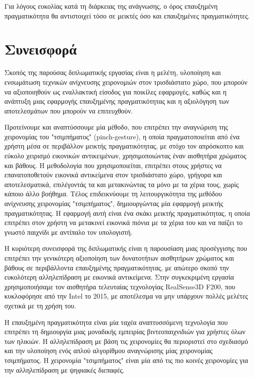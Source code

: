 Για λόγους ευκολίας κατά τη διάρκειας της ανάγνωσης, ο όρος επαυξημένη πραγματικότητα θα αντιστοιχεί τόσο σε μεικτές όσο και επαυξημένες πραγματικότητες.



\section{Συνεισφορά}

  

Σκοπός της παρούσας διπλωματικής εργασίας είναι η μελέτη, υλοποίηση και ενσωμάτωση τεχνικών ανίχνευσης χειρονομιών στον τρισδιάστατο χώρο, που μπορούν να αξιοποιηθούν ως εναλλακτική είσοδος για ποικίλες εφαρμογές, καθώς και η ανάπτυξη μιας εφαρμογής επαυξημένης πραγματικότητας και η αξιολόγηση των αποτελεσμάτων που μπορούν να επιτευχθούν. 



Προτείνουμε και αναπτύσσουμε μία μέθοδο, που επιτρέπει την αναγνώριση της χειρονομίας του "τσιμπήματος" (pinch-gesture), η οποία πραγματοποιείται από ένα χρήστη μέσα σε περιβάλλον μεικτής πραγματικότητας, με στόχο τον απρόσκοπτο και εύκολο χειρισμό εικονικών αντικειμένων, χρησιμοποιώντας έναν αισθητήρα χρώματος και βάθους. Η μεθοδολογία που χρησιμοποιείται, επιτρέπει στους χρήστες να επανατοποθετούν εικονικά αντικείμενα στον τρισδιάστατο χώρο, γρήγορα και αποτελεσματικά, επιλέγοντάς τα και μετακινώντας τα μόνο με τα χέρια τους, χωρίς κάποιο άλλο βοήθημα.
Τέλος επιδεικνύουμε τη λειτουργικότητα της μεθόδου ανίχνευσης χειρονομίας "τσιμπήματος", δημιουργώντας μία εφαρμογή μεικτής πραγματικότητας. Η εφαρμογή αυτή είναι ένα σκάκι μεικτής πραγματικότητας, η οποία επιτρέπει στον χρήστη να μετακινεί εικονικά πιόνια με τα χέρια του και να παίζει το γνωστό παιχνίδι με αντίπαλο τον υπολογιστή.


Η κυριότερη συνεισφορά της διπλωματικής είναι η παρουσίαση μιας προσέγγισης που επιτρέπει την γενικότερη αξιοποίηση των δυνατοτήτων αισθητήρων χρώματος και βάθους σε περιβάλλοντα επαυξημένης πραγματικότητας, με απώτερο σκοπό την ευκολότερη αλληλεπίδραση με εικονικά αντικείμενα. Στην συγκεκριμένη εργασία χρησιμοποιήσαμε τον αισθητήρα τελευταίας τεχνολογίας RealSense\textregistered 3D F200, που κυκλοφόρησε από την Intel το 2015, με αποτέλεσμα να μην υπάρχουν πολλές μελέτες σχετικά με τη χρήση του.


Η επαυξημένη πραγματικότητα είναι μία ταχέα αναπτυσσόμενη τεχνολογία που επιτρέπει τη δημιουργία μιας μοναδικής εμπειρίας βιντεοπαιχνιδιών για χρήστες όλων των ηλικιών. Η αλληλεπίδραση με βάση τις χειρονομίες θα περιοριστεί στο σχεδιασμό και την υλοποίηση ενός απλού αλγορίθμου αναγνώρισης μίας χειρονομίας τσιμπήματος. Η χειρονομία "τσιμπήματος" είναι μία από τις πιο κοινές χειρονομίες για την αλληλεπίδραση με ψηφιακές διεπαφές. 


